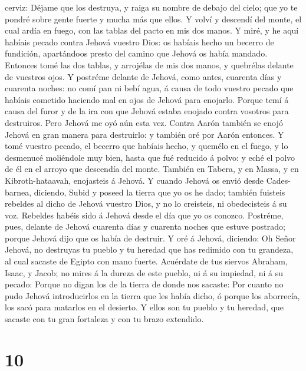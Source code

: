 cerviz:  Déjame que los destruya, y raiga su nombre de
debajo del cielo; que yo te pondré sobre gente fuerte y mucha más que
ellos.  Y volví y descendí del monte, el cual ardía en
fuego, con las tablas del pacto en mis dos manos.  Y
miré, y he aquí habíais pecado contra Jehová vuestro Dios: os habíais
hecho un becerro de fundición, apartándoos presto del camino que Jehová
os había mandado.  Entonces tomé las dos tablas, y
arrojélas de mis dos manos, y quebrélas delante de vuestros ojos.
 Y postréme delante de Jehová, como antes, cuarenta días
y cuarenta noches: no comí pan ni bebí agua, á causa de todo vuestro
pecado que habíais cometido haciendo mal en ojos de Jehová para
enojarlo.  Porque temí á causa del furor y de la ira con
que Jehová estaba enojado contra vosotros para destruiros. Pero Jehová
me oyó aún esta vez.  Contra Aarón también se enojó
Jehová en gran manera para destruirlo: y también oré por Aarón entonces.
 Y tomé vuestro pecado, el becerro que habíais hecho, y
quemélo en el fuego, y lo desmenucé moliéndole muy bien, hasta que fué
reducido á polvo: y eché el polvo de él en el arroyo que descendía del
monte.  También en Tabera, y en Massa, y en
Kibroth-hataavah, enojasteis á Jehová.  Y cuando Jehová
os envió desde Cades-barnea, diciendo, Subid y poseed la tierra que yo
os he dado; también fuisteis rebeldes al dicho de Jehová vuestro Dios, y
no lo creisteis, ni obedecisteis á su voz.  Rebeldes
habéis sido á Jehová desde el día que yo os conozco. 
Postréme, pues, delante de Jehová cuarenta días y cuarenta noches que
estuve postrado; porque Jehová dijo que os había de destruir.
 Y oré á Jehová, diciendo: Oh Señor Jehová, no destruyas
tu pueblo y tu heredad que has redimido con tu grandeza, al cual sacaste
de Egipto con mano fuerte.  Acuérdate de tus siervos
Abraham, Isaac, y Jacob; no mires á la dureza de este pueblo, ni á su
impiedad, ni á su pecado:  Porque no digan los de la
tierra de donde nos sacaste: Por cuanto no pudo Jehová introducirlos en
la tierra que les había dicho, ó porque los aborrecía, los sacó para
matarlos en el desierto.  Y ellos son tu pueblo y tu
heredad, que sacaste con tu gran fortaleza y con tu brazo extendido.

\hypertarget{section-9}{%
\section{10}\label{section-9}}

